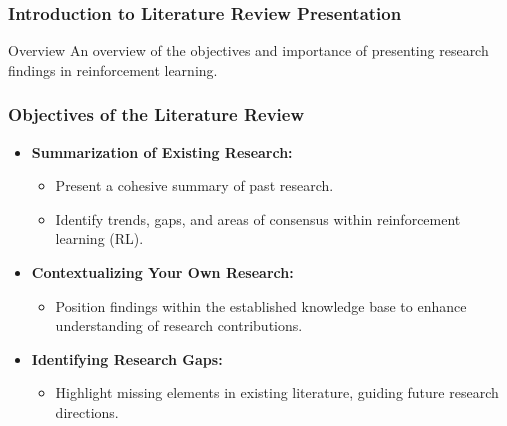 \documentclass[aspectratio=169]{beamer}
\begin{document}
\frame{\titlepage}

\begin{frame}[fragile]
    \frametitle{Introduction to Literature Review Presentation}
    \begin{block}{Overview}
        An overview of the objectives and importance of presenting research findings in reinforcement learning.
    \end{block}
\end{frame}

\begin{frame}[fragile]
    \frametitle{Objectives of the Literature Review}
    \begin{itemize}
        \item \textbf{Summarization of Existing Research:}
        \begin{itemize}
            \item Present a cohesive summary of past research.
            \item Identify trends, gaps, and areas of consensus within reinforcement learning (RL).
        \end{itemize}
        
        \item \textbf{Contextualizing Your Own Research:}
        \begin{itemize}
            \item Position findings within the established knowledge base to enhance understanding of research contributions.
        \end{itemize}
        
        \item \textbf{Identifying Research Gaps:}
        \begin{itemize}
            \item Highlight missing elements in existing literature, guiding future research directions.
        \end{itemize}
    \end{itemize}
\end{frame}
\end{document}
